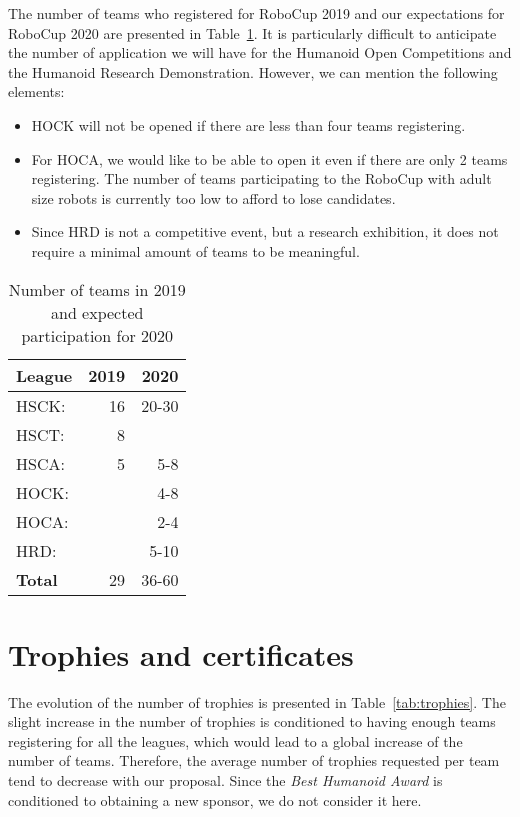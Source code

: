 \documentclass{article}
\begin{document}
The number of teams who registered for RoboCup 2019 and our expectations for
RoboCup 2020 are presented in Table~\ref{tab:nb_teams}.
It is particularly difficult to anticipate the number of application we will
have for the Humanoid Open Competitions and the Humanoid Research Demonstration.
However, we can mention the following elements:
\begin{itemize}
\item HOCK will not be opened if there are less than four teams registering.
\item For HOCA, we would like to be able to open it even if there are only 2
  teams registering.
  The number of teams participating to the RoboCup with adult size robots is
  currently too low to afford to lose candidates.
\item Since HRD is not a competitive event, but a research exhibition,
  it does not require a minimal amount of teams to be meaningful.
\end{itemize}

\begin{table}[h]
  \centering
  \caption{\label{tab:nb_teams}Number of teams in 2019 and expected
    participation for 2020}
  \begin{tabular}{l | r | r}
    League & 2019 & 2020\\
    \hline
    HSCK: & 16 & 20-30\\ 
    HSCT: & 8 & \\ 
    HSCA: & 5 & 5-8\\ 
    HOCK: &  & 4-8\\
    HOCA: &  & 2-4\\ 
    HRD: &  & 5-10\\
    \hline
    \textbf{Total} & 29 & 36-60
  \end{tabular}
\end{table}


\section{Trophies and certificates}

The evolution of the number of trophies is presented in
Table~\ref{tab:trophies}.
The slight increase in the number of trophies is conditioned to having enough
teams registering for all the leagues, which would lead to a global increase of
the number of teams.
Therefore, the average number of trophies requested per team tend to decrease
with our proposal.
Since the \emph{Best Humanoid Award} is conditioned to obtaining a new sponsor,
we do not consider it here.
\end{document}
